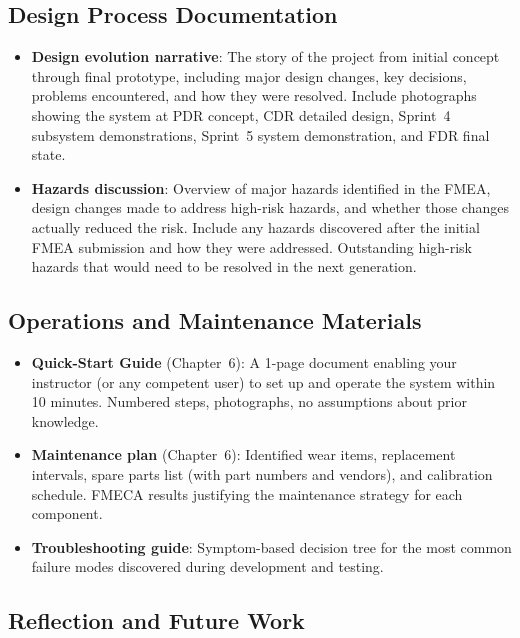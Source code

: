 \documentclass[11pt,letterpaper,twoside,openany]{book}
\begin{document}
\subsection{Design Process Documentation}

\begin{itemize}[leftmargin=1.5em]
\item \textbf{Design evolution narrative}: The story of the project from initial concept through final prototype, including major design changes, key decisions, problems encountered, and how they were resolved. Include photographs showing the system at PDR concept, CDR detailed design, Sprint~4 subsystem demonstrations, Sprint~5 system demonstration, and FDR final state.
\item \textbf{Hazards discussion}: Overview of major hazards identified in the FMEA, design changes made to address high-risk hazards, and whether those changes actually reduced the risk. Include any hazards discovered after the initial FMEA submission and how they were addressed. Outstanding high-risk hazards that would need to be resolved in the next generation.
\end{itemize}

\subsection{Operations and Maintenance Materials}

\begin{itemize}[leftmargin=1.5em]
\item \textbf{Quick-Start Guide} (Chapter~6): A 1-page document enabling your instructor (or any competent user) to set up and operate the system within 10 minutes. Numbered steps, photographs, no assumptions about prior knowledge.
\item \textbf{Maintenance plan} (Chapter~6): Identified wear items, replacement intervals, spare parts list (with part numbers and vendors), and calibration schedule. FMECA results justifying the maintenance strategy for each component.
\item \textbf{Troubleshooting guide}: Symptom-based decision tree for the most common failure modes discovered during development and testing.
\end{itemize}

\subsection{Reflection and Future Work}
\end{document}
